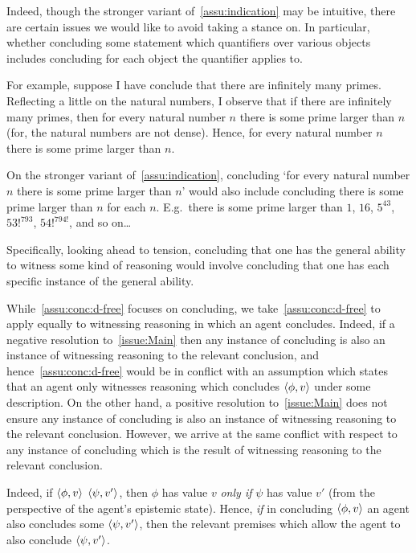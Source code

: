 \begin{note}
  Indeed, though the stronger variant of~\autoref{assu:indication} may be intuitive, there are certain issues we would like to avoid taking a stance on.
  In particular, whether concluding some statement which quantifiers over various objects includes concluding for each object the quantifier applies to.

  For example, suppose I have conclude that there are infinitely many primes.
  Reflecting a little on the natural numbers, I observe that if there are infinitely many primes, then for every natural number \(n\) there is some prime larger than \(n\) (for, the natural numbers are not dense).
  Hence, for every natural number \(n\) there is some prime larger than \(n\).

  On the stronger variant of~\autoref{assu:indication}, concluding `for every natural number \(n\) there is some prime larger than \(n\)' would also include concluding there is some prime larger than \(n\) for each \(n\).
  E.g.\ there is some prime larger than \(1\), \(16\), \(5^{43}\), \(53!^{793}\), \(54!^{794!}\), and so on\dots

  Specifically, looking ahead to tension, concluding that one has the general ability to witness some kind of reasoning would involve concluding that one has each specific instance of the general ability.
\end{note}

\begin{note}[Witnessing]
    While~\autoref{assu:conc:d-free} focuses on concluding, we take~\autoref{assu:conc:d-free} to apply equally to witnessing reasoning in which an agent concludes.
  Indeed, if a negative resolution to~\autoref{issue:Main} then any instance of concluding is also an instance of witnessing reasoning to the relevant conclusion, and hence~\autoref{assu:conc:d-free} would be in conflict with an assumption which states that an agent only witnesses reasoning which concludes \(\langle \phi, v \rangle\) under some description.
  On the other hand, a positive resolution to~\autoref{issue:Main} does not ensure any instance of concluding is also an instance of witnessing reasoning to the relevant conclusion.
  However, we arrive at the same conflict with respect to any instance of concluding which is the result of witnessing reasoning to the relevant conclusion.

  Indeed, if \(\langle \phi, v \rangle\) \indicatePr{} \(\langle \psi, v' \rangle\), then \(\phi\) has value \(v\) \emph{only if} \(\psi\) has value \(v'\) (from the perspective of the agent's epistemic state).
  Hence, \emph{if} in concluding \(\langle \phi, v \rangle\) an agent also concludes some \indicateVed{} \(\langle \psi, v' \rangle\), then the relevant premises which allow the agent to also conclude \(\langle \psi, v' \rangle\).
\end{note}

